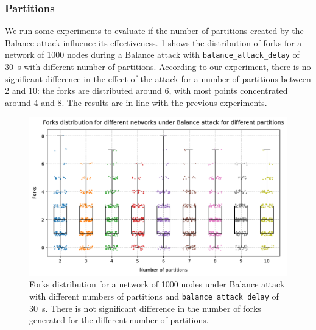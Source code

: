 \clearpage

\subsubsection{Partitions}
We run some experiments to evaluate if the number of partitions created by the Balance attack influence its effectiveness.
\cref{fig:forks-attack-partitions} shows the distribution of forks for a network of \num{1000} nodes during a Balance attack with \texttt{balance\_attack\_delay} of \SI{30}{\second} with different number of partitions.
According to our experiment, there is no significant difference in the effect of the attack for a number of partitions between \num{2} and \num{10}:
the forks are distributed around \num{6}, with most points concentrated around \num{4} and \num{8}.
The results are in line with the previous experiments.

\begin{figure}[t]
	\centering
	\vspace*{0.25cm}
	\includegraphics[width=\myplotswitdth \columnwidth]{plots/forks_attack_partitions_boxplot}
	\caption[Forks distribution for a network of 1000 nodes under Balance attack with different numbers of partitions]{
		Forks distribution for a network of 1000 nodes under Balance attack with different numbers of partitions and \texttt{balance\_attack\_delay} of \SI{30}{s}.
		There is not significant difference in the number of forks generated for the different number of partitions.
	}
	\label{fig:forks-attack-partitions}
\end{figure}


